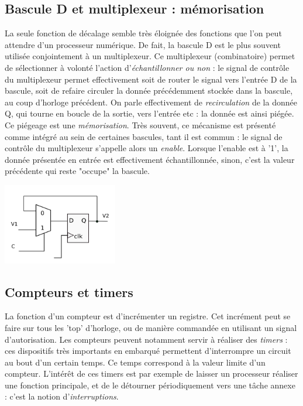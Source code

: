 \subsection{Bascule D et multiplexeur : mémorisation}
La seule fonction de décalage semble très éloignée des fonctions que l'on peut attendre d'un processeur numérique. De fait,
la bascule D est le plus souvent utilisée conjointement à un multiplexeur. Ce multiplexeur (combinatoire) permet de sélectionner
à volonté l'action d'{\it échantillonner ou non} : le signal de contrôle du multiplexeur permet effectivement soit de router le signal vers l'entrée D de la bascule, soit
de refaire circuler la donnée précédemment stockée dans la bascule, au coup d'horloge précédent. On parle effectivement de {\it recirculation} de la donnée Q, qui tourne
en boucle de la sortie, vers l'entrée etc : la donnée est ainsi piégée. Ce piégeage est une {\it mémorisation}. Très souvent, ce mécanisme est présenté comme
intégré au sein de certaines bascules, tant il est commun : le signal de contrôle du multiplexeur s'appelle alors un {\it enable}. Lorsque l'enable est à '1',
la donnée présentée en entrée est effectivement échantillonnée, sinon, c'est la valeur précédente qui reste "occupe" la bascule.

\begin{center}
  \includegraphics[width=5cm]{./figures/dff-enable.png}
\end{center}


\subsection{Compteurs et timers}
La fonction d'un compteur est d'incrémenter un registre. Cet incrément peut se faire sur tous les 'top' d'horloge, ou de manière commandée en utilisant un signal d'autorisation.
Les compteurs peuvent notamment servir à réaliser des {\it timers} : ces dispositifs très importants en embarqué permettent d'interrompre un circuit au bout d'un certain temps. Ce temps
correspond à la valeur limite d'un compteur. L'intérêt de ces timers est par exemple de laisser un processeur réaliser une fonction principale, et de le détourner périodiquement vers une tâche annexe : c'est la notion
d'{\it interruptions}.

